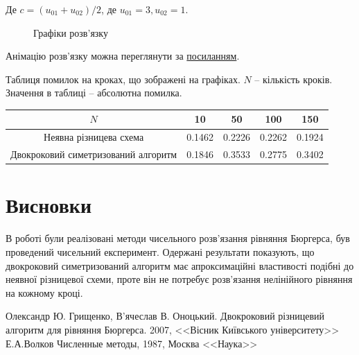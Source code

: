 \documentclass[a4paper,12pt]{article}
\begin{document}
Де $c = (u_{01} + u_{02})/2$, де $u_{01} = 3, u_{02} = 1$.

\begin{figure}[ht]
	\caption{Графіки розв'язку}
	\label{fig:sss1}
\end{figure}

Анімацію розв'язку можна переглянути за  \href{https://github.com/AlKravets/Numerical-model-of-dynamics-of-systems/blob/master/lab2/gif/res_animation.gif}{посиланням}.

Таблиця помилок на кроках, що зображені на графіках. $N$ -- кількість кроків. Значення в таблиці -- абсолютна помилка.

\begin{tabular}{| c | c | c | c | c |}
	\hline
	$N$  &  10 & 50 & 100 & 150 \\
	\hline
	Неявна різницева схема & 0.1462 & 0.2226 & 0.2262 & 0.1924 \\
	Двокроковий симетризований алгоритм & 0.1846 & 0.3533 & 0.2775 & 0.3402 \\
	\hline
\end{tabular}


\section{Висновки}
В роботі були реалізовані методи чисельного розв'язання рівняння Бюргерса, був проведений чисельний експеримент. Одержані результати показують, що двокроковий симетризований алгоритм має апроксимаційні властивості подібні до неявної різницевої схеми, проте він не потребує розв'язання нелінійного рівняння на кожному кроці.


\begin{thebibliography}{}
	 Олександр Ю. Грищенко, В’ячеслав В. Оноцький. Двокроковий різницевий алгоритм для рівняння Бюргерса. 2007, <<Вісник Київського університету>>
	  Е.А.Волков Численные методы, 1987, Москва <<Наука>>
\end{thebibliography}
\end{document}

